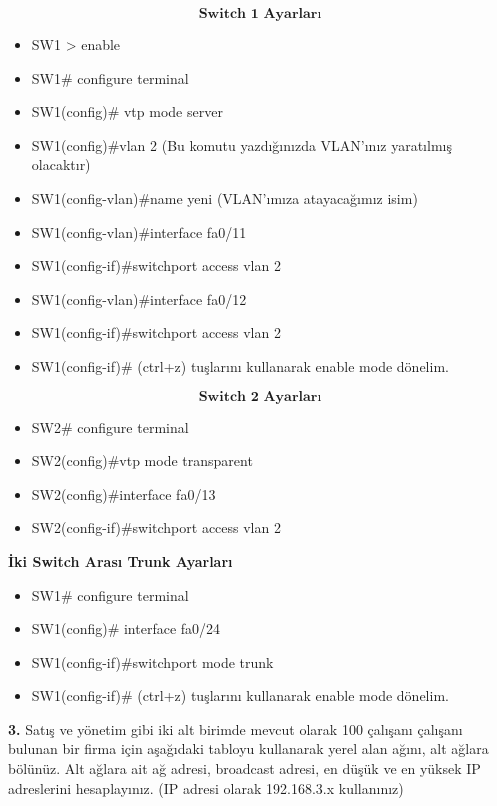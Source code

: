 \documentclass[a4paper,10pt]{article}
\begin{document}
\begin{multicols}{2}
  $$\textbf{Switch 1 Ayarları}$$
  \begin{itemize}
    \item SW1 > enable
\item SW1\# configure terminal
\item SW1(config)\# vtp mode server
\item SW1(config)\#vlan 2 (Bu komutu yazdığınızda VLAN’ınız yaratılmış olacaktır)
\item SW1(config-vlan)\#name yeni (VLAN’ımıza atayacağımız isim)
\item SW1(config-vlan)\#interface fa0/11
\item SW1(config-if)\#switchport access vlan 2
\item SW1(config-vlan)\#interface fa0/12
\item SW1(config-if)\#switchport access vlan 2
\item SW1(config-if)\# (ctrl+z) tuşlarını kullanarak enable mode dönelim.
  \end{itemize}

\columnbreak

  $$\textbf{Switch 2 Ayarları}$$
  \begin{itemize}
    \item SW2\# configure terminal
\item SW2(config)\#vtp mode transparent
\item SW2(config)\#interface fa0/13
\item SW2(config-if)\#switchport access vlan 2 
  \end{itemize}

\end{multicols}

\vspace{1cm}

  \textbf{İki Switch Arası Trunk Ayarları}
  \begin{itemize}
    \item SW1\# configure terminal
\item SW1(config)\# interface fa0/24
\item SW1(config-if)\#switchport mode trunk
\item SW1(config-if)\# (ctrl+z) tuşlarını kullanarak enable mode dönelim.
  \end{itemize}


\pagebreak

\textbf{3. } Satış ve yönetim gibi iki alt birimde mevcut olarak 100 çalışanı çalışanı bulunan bir firma için
aşağıdaki tabloyu kullanarak yerel alan ağını, alt ağlara bölünüz. Alt ağlara ait ağ adresi,
broadcast adresi, en düşük ve en yüksek IP adreslerini hesaplayınız. (IP adresi olarak
192.168.3.x kullanınız)
\end{document}
